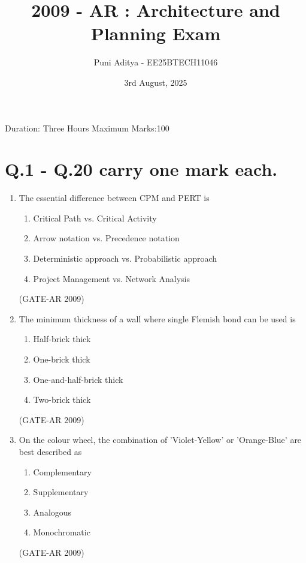 \documentclass[a4paper,10pt]{article}
\begin{document}
\title{2009 - AR : Architecture and Planning Exam}
\author{Puni Aditya - EE25BTECH11046}
\date{3rd August, 2025}
\maketitle
Duration: Three Hours \hfill Maximum Marks:100

\section*{Q.1 - Q.20 carry one mark each.}

\begin{enumerate}
    \item The essential difference between CPM and PERT is 
    \begin{enumerate}
        \item Critical Path vs. Critical Activity
        \item Arrow notation vs. Precedence notation
        \item Deterministic approach vs. Probabilistic approach
        \item Project Management vs. Network Analysis
    \end{enumerate}
    \hfill (GATE-AR 2009)
    
    \item The minimum thickness of a wall where single Flemish bond can be used is 
    \begin{enumerate}
        \item Half-brick thick
        \item One-brick thick
        \item One-and-half-brick thick
        \item Two-brick thick
    \end{enumerate}
    \hfill (GATE-AR 2009)
    
    \item On the colour wheel, the combination of 'Violet-Yellow' or 'Orange-Blue' are best described as 
    \begin{multicols}{4}
	\begin{enumerate}
        \item Complementary
        \item Supplementary
        \item Analogous
        \item Monochromatic
    \end{enumerate}
	\end{multicols}
    \hfill (GATE-AR 2009)
    

\end{enumerate}
\end{document}
